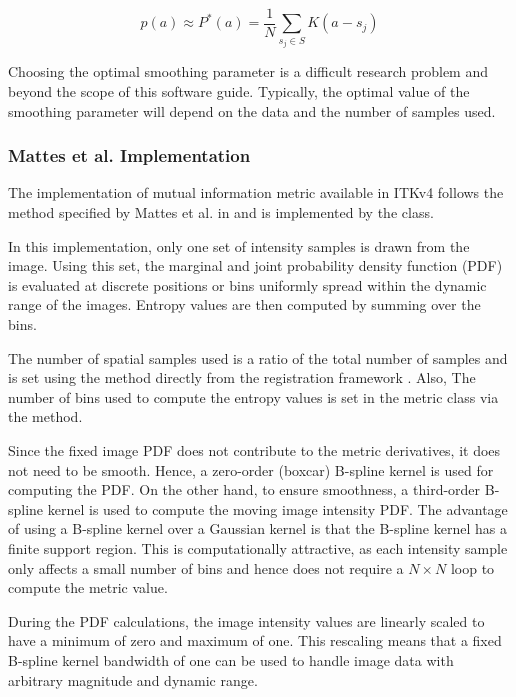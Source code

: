 \begin{equation}
p(a) \approx P^{*}(a) = \frac{1}{N} \sum_{s_j \in S} K\left(a - s_j\right)
\end{equation}

Choosing the optimal smoothing parameter is a difficult research problem and
beyond the scope of this software guide.  Typically, the optimal value of the
smoothing parameter will depend on the data and the number of samples used.

\subsubsection{Mattes et al. Implementation}
The implementation of mutual information metric available in ITKv4 follows
the method specified by Mattes et al. in \cite{Mattes2001} and is implemented
by the  class.

In this implementation, only one set of intensity samples is drawn from the
image.  Using this set, the marginal and joint probability density function
(PDF) is evaluated at discrete positions or bins uniformly spread within the
dynamic range of the images. Entropy values are then computed by summing over
the bins.


The number of spatial samples used is a ratio of the total number of samples
and is set using the  method directly from
the registration framework . Also, The number
of bins used to compute the entropy values is set in the metric class
via the  method.

Since the fixed image PDF does not contribute to the metric derivatives, it
does not need to be smooth. Hence, a zero-order (boxcar) B-spline kernel is
used for computing the PDF. On the other hand, to ensure smoothness, a
third-order B-spline kernel is used to compute the moving image intensity PDF. The
advantage of using a B-spline kernel over a Gaussian kernel is that the
B-spline kernel has a finite support region. This is computationally
attractive, as each intensity sample only affects a small number of bins and
hence does not require a $N \times N$ loop to compute the metric value.

During the PDF calculations, the image intensity values are linearly scaled
to have a minimum of zero and maximum of one. This rescaling means that a
fixed B-spline kernel bandwidth of one can be used to handle image data with
arbitrary magnitude and dynamic range.


